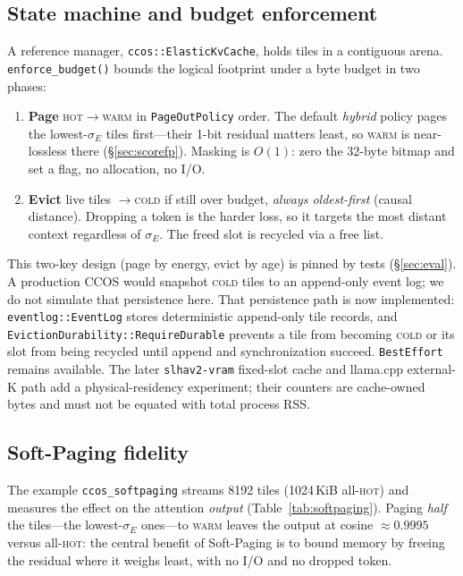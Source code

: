 \documentclass[11pt]{article}
\newcommand{\added}[1]{\textcolor{revisionblue}{#1}}
\newcommand{\deleted}[1]{\textcolor{revisionred}{#1}}
\theoremstyle{plain}
\theoremstyle{definition}
\newcommand{\sigE}{\sigma_E}
\begin{document}
\subsection{State machine and budget enforcement}
A reference manager, \texttt{ccos::ElasticKvCache}, holds tiles in a
contiguous arena. \texttt{enforce\_budget()} bounds the logical footprint
under a byte budget in two phases:

\begin{enumerate}[leftmargin=1.6em,itemsep=2pt]
  \item \textbf{Page} \textsc{hot}$\to$\textsc{warm} in
    \texttt{PageOutPolicy} order. The default \emph{hybrid} policy pages
    the lowest-$\sigE$ tiles first---their 1-bit residual matters least,
    so \textsc{warm} is near-lossless there (\S\ref{sec:scorefp}).
    Masking is $O(1)$: zero the 32-byte bitmap and set a flag, no
    allocation, no I/O.
  \item \textbf{Evict} live tiles $\to$\textsc{cold} if still over
    budget, \emph{always oldest-first} (causal distance). Dropping a
    token is the harder loss, so it targets the most distant context
    regardless of $\sigE$. The freed slot is recycled via a free list.
\end{enumerate}

This two-key design (page by energy, evict by age) is pinned by tests
(\S\ref{sec:eval}).
\deleted{A production CCOS would snapshot \textsc{cold} tiles
to an append-only event log; we do not simulate that persistence here.}
\added{That persistence path is now implemented: \texttt{eventlog::EventLog}
stores deterministic append-only tile records, and
\texttt{EvictionDurability::RequireDurable} prevents a tile from becoming
\textsc{cold} or its slot from being recycled until append and synchronization
succeed. \texttt{BestEffort} remains available. The later
\texttt{slhav2-vram} fixed-slot cache and llama.cpp external-K path add a
physical-residency experiment; their counters are cache-owned bytes and must
not be equated with total process RSS.}

\subsection{Soft-Paging fidelity}
The example \texttt{ccos\_softpaging} streams 8192 tiles (1024\,KiB
all-\textsc{hot}) and measures the effect on the attention
\emph{output} (Table~\ref{tab:softpaging}). Paging \emph{half} the
tiles---the lowest-$\sigE$ ones---to \textsc{warm} leaves the output at
cosine $\approx 0.9995$ versus all-\textsc{hot}: the central benefit of
Soft-Paging is to bound memory by freeing the residual where it weighs
least, with no I/O and no dropped token.
\end{document}

